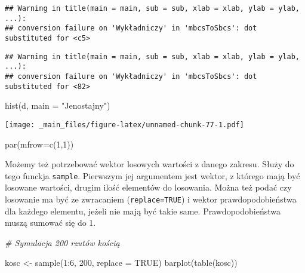 \documentclass[
]{book}
\newenvironment{Shaded}{\begin{snugshade}}{\end{snugshade}}
\newcommand{\AttributeTok}[1]{\textcolor[rgb]{0.77,0.63,0.00}{#1}}
\newcommand{\CommentTok}[1]{\textcolor[rgb]{0.56,0.35,0.01}{\textit{#1}}}
\newcommand{\ConstantTok}[1]{\textcolor[rgb]{0.00,0.00,0.00}{#1}}
\newcommand{\DecValTok}[1]{\textcolor[rgb]{0.00,0.00,0.81}{#1}}
\newcommand{\FunctionTok}[1]{\textcolor[rgb]{0.00,0.00,0.00}{#1}}
\newcommand{\NormalTok}[1]{#1}
\newcommand{\OtherTok}[1]{\textcolor[rgb]{0.56,0.35,0.01}{#1}}
\newcommand{\SpecialCharTok}[1]{\textcolor[rgb]{0.00,0.00,0.00}{#1}}
\newcommand{\StringTok}[1]{\textcolor[rgb]{0.31,0.60,0.02}{#1}}
\begin{document}
\begin{verbatim}
## Warning in title(main = main, sub = sub, xlab = xlab, ylab = ylab, ...):
## conversion failure on 'Wykładniczy' in 'mbcsToSbcs': dot substituted for <c5>
\end{verbatim}

\begin{verbatim}
## Warning in title(main = main, sub = sub, xlab = xlab, ylab = ylab, ...):
## conversion failure on 'Wykładniczy' in 'mbcsToSbcs': dot substituted for <82>
\end{verbatim}

\begin{Shaded}
\begin{Highlighting}[]
\FunctionTok{hist}\NormalTok{(d, }\AttributeTok{main =} \StringTok{"Jenostajny"}\NormalTok{)}
\end{Highlighting}
\end{Shaded}

\texttt{[image: \_main\_files/figure-latex/unnamed-chunk-77-1.pdf]}

\begin{Shaded}
\begin{Highlighting}[]
\FunctionTok{par}\NormalTok{(}\AttributeTok{mfrow=}\FunctionTok{c}\NormalTok{(}\DecValTok{1}\NormalTok{,}\DecValTok{1}\NormalTok{))}
\end{Highlighting}
\end{Shaded}

Możemy też potrzebować wektor losowych wartości z danego zakresu. Służy do tego funckja \texttt{sample}. Pierwszym jej argumentem jest wektor, z którego mają być losowane wartości, drugim ilość elementów do losowania. Można też podać czy losowanie ma być ze zwracaniem (\texttt{replace=TRUE}) i wektor prawdopodobieństwa dla każdego elementu, jeżeli nie mają być takie same. Prawdopodobieństwa muszą sumować się do 1.

\begin{Shaded}
\begin{Highlighting}[]
\CommentTok{\# Symulacja 200 rzutów kością}

\NormalTok{kosc }\OtherTok{\textless{}{-}} \FunctionTok{sample}\NormalTok{(}\DecValTok{1}\SpecialCharTok{:}\DecValTok{6}\NormalTok{, }\DecValTok{200}\NormalTok{, }\AttributeTok{replace =} \ConstantTok{TRUE}\NormalTok{)}
\FunctionTok{barplot}\NormalTok{(}\FunctionTok{table}\NormalTok{(kosc))}
\end{Highlighting}
\end{Shaded}
\end{document}
